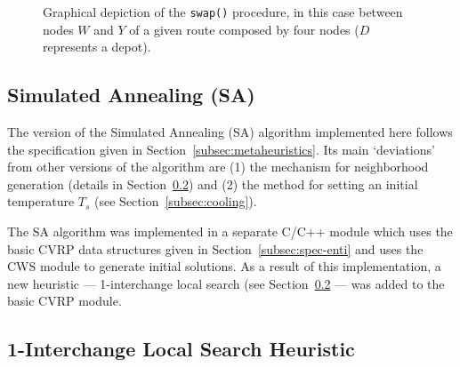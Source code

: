 \begin{figure}[h!]
    \centering



    \cprotect\caption{Graphical depiction of the \verb?swap()? procedure, 
        in this case between nodes $W$ and $Y$ of a given route composed by 
        four nodes ($D$ represents a depot).}
    \label{fig:2-opt}

\end{figure}

\subsection{Simulated Annealing (SA)}
\label{subsec:sa}

The version of the Simulated Annealing (SA) algorithm implemented here follows 
the specification given in Section~\ref{subsec:metaheuristics}. Its main 
`deviations' from other versions of the algorithm are (1) the mechanism for 
neighborhood generation (details in Section~\ref{subsec:1-ichange}) and (2) the 
method for setting an initial temperature $T_s$ (see 
Section~\ref{subsec:cooling}).\vertbreak

The SA algorithm was implemented in a separate C\slash C++ module which uses 
the basic CVRP data structures given in Section~\ref{subsec:spec-enti} and uses 
the CWS module to generate initial solutions. As a result of this 
implementation, a new heuristic --- 1-interchange local search (see 
Section~\ref{subsec:1-ichange} --- was added to the basic CVRP module.

\subsection{1-Interchange Local Search Heuristic}
\label{subsec:1-ichange}


